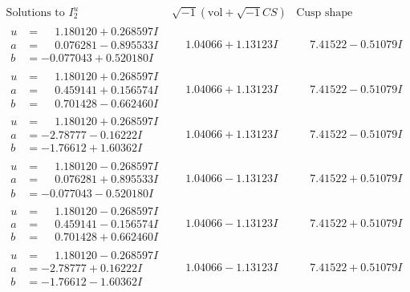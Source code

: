 \documentclass[1p]{elsarticle_modified}
\theoremstyle{definition}
\newcommand{\I}{\sqrt{-1}}
\begin{document}
$$\begin{array}{c|c|c}  
\text{Solutions to }I^u_{2}& \I (\text{vol} + \sqrt{-1}CS) & \text{Cusp shape}\\
 \hline 
\begin{aligned}
u &= \phantom{-}1.180120 + 0.268597 I \\
a &= \phantom{-}0.076281 - 0.895533 I \\
b &= -0.077043 + 0.520180 I\end{aligned}
 & \phantom{-}1.04066 + 1.13123 I & \phantom{-}7.41522 - 0.51079 I \\ \hline\begin{aligned}
u &= \phantom{-}1.180120 + 0.268597 I \\
a &= \phantom{-}0.459141 + 0.156574 I \\
b &= \phantom{-}0.701428 - 0.662460 I\end{aligned}
 & \phantom{-}1.04066 + 1.13123 I & \phantom{-}7.41522 - 0.51079 I \\ \hline\begin{aligned}
u &= \phantom{-}1.180120 + 0.268597 I \\
a &= -2.78777 - 0.16222 I \\
b &= -1.76612 + 1.60362 I\end{aligned}
 & \phantom{-}1.04066 + 1.13123 I & \phantom{-}7.41522 - 0.51079 I \\ \hline\begin{aligned}
u &= \phantom{-}1.180120 - 0.268597 I \\
a &= \phantom{-}0.076281 + 0.895533 I \\
b &= -0.077043 - 0.520180 I\end{aligned}
 & \phantom{-}1.04066 - 1.13123 I & \phantom{-}7.41522 + 0.51079 I \\ \hline\begin{aligned}
u &= \phantom{-}1.180120 - 0.268597 I \\
a &= \phantom{-}0.459141 - 0.156574 I \\
b &= \phantom{-}0.701428 + 0.662460 I\end{aligned}
 & \phantom{-}1.04066 - 1.13123 I & \phantom{-}7.41522 + 0.51079 I \\ \hline\begin{aligned}
u &= \phantom{-}1.180120 - 0.268597 I \\
a &= -2.78777 + 0.16222 I \\
b &= -1.76612 - 1.60362 I\end{aligned}
 & \phantom{-}1.04066 - 1.13123 I & \phantom{-}7.41522 + 0.51079 I \\ \hline\begin{aligned}

\end{aligned}
\end{array}$$
\end{document}
